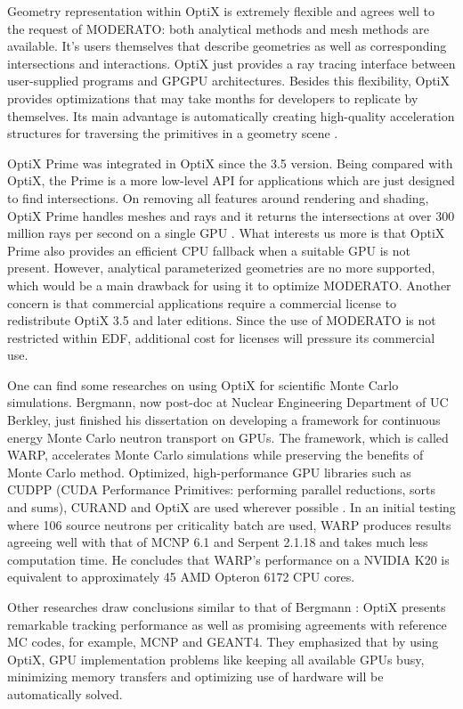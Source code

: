 Geometry representation within OptiX is extremely flexible and agrees well to the request of MODERATO: both analytical methods and mesh methods are available. It's users themselves that describe geometries as well as corresponding intersections and interactions. OptiX just provides a ray tracing interface between user-supplied programs and GPGPU architectures. Besides this flexibility, OptiX provides optimizations that may take months for developers to replicate by themselves. Its main advantage is automatically creating high-quality acceleration structures for traversing the primitives in a geometry scene \citep{Reference6}.

OptiX Prime was integrated in OptiX since the 3.5 version. Being compared with OptiX, the Prime is a more low-level API for applications which are just designed to find intersections. On removing all features around rendering and shading, OptiX Prime handles meshes and rays and it returns the intersections at over 300 million rays per second on a single GPU \citep{optixgroup}. What interests us more is that OptiX Prime also provides an efficient CPU fallback when a suitable GPU is not present. However, analytical parameterized geometries are no more supported, which would be a main drawback for using it to optimize MODERATO. Another concern is that commercial applications require a commercial license to redistribute OptiX 3.5 and later editions. Since the use of MODERATO is not restricted within EDF, additional cost for licenses will pressure its commercial use.

One can find some researches on using OptiX for scientific Monte Carlo simulations. Bergmann, now post-doc at Nuclear Engineering Department of UC Berkley, just finished his dissertation on developing a framework for continuous energy Monte Carlo neutron transport on GPUs. The framework, which is called WARP, accelerates Monte Carlo simulations while preserving the benefits of Monte Carlo method. Optimized, high-performance GPU libraries such as CUDPP (CUDA Performance Primitives: performing parallel reductions, sorts and sums), CURAND and OptiX are used wherever possible \citep{Reference2}. In an initial testing where 106 source neutrons per criticality batch are used, WARP produces results agreeing well with that of MCNP 6.1 and Serpent 2.1.18 and takes much less computation time. He concludes that WARP’s performance on a NVIDIA K20 is equivalent to approximately 45 AMD Opteron 6172 CPU cores.

Other researches draw conclusions similar to that of Bergmann \citep{gpuconf, Safari2014101}: OptiX presents remarkable tracking performance as well as promising agreements with reference MC codes, for example, MCNP and GEANT4. They emphasized that by using OptiX, GPU implementation problems like keeping all available GPUs busy, minimizing memory transfers and optimizing use of hardware will be automatically solved.

